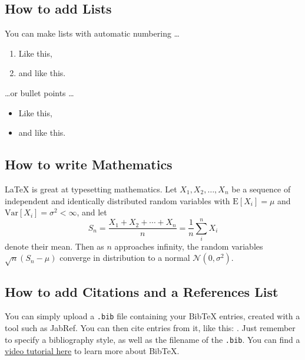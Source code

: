 \documentclass{article}
\begin{document}
\subsection{How to add Lists}

You can make lists with automatic numbering \dots

\begin{enumerate}
\item Like this,
\item and like this.
\end{enumerate}
\dots or bullet points \dots
\begin{itemize}
\item Like this,
\item and like this.
\end{itemize}

\subsection{How to write Mathematics}

\LaTeX{} is great at typesetting mathematics. Let $X_1, X_2, \ldots, X_n$ be a sequence of independent and identically distributed random variables with $\text{E}[X_i] = \mu$ and $\text{Var}[X_i] = \sigma^2 < \infty$, and let
\[S_n = \frac{X_1 + X_2 + \cdots + X_n}{n}
      = \frac{1}{n}\sum_{i}^{n} X_i\]
denote their mean. Then as $n$ approaches infinity, the random variables $\sqrt{n}(S_n - \mu)$ converge in distribution to a normal $\mathcal{N}(0, \sigma^2)$.


\subsection{How to add Citations and a References List}

You can simply upload a \verb|.bib| file containing your BibTeX entries, created with a tool such as JabRef. You can then cite entries from it, like this: \cite{greenwade93}. Just remember to specify a bibliography style, as well as the filename of the \verb|.bib|. You can find a \href{https://www.overleaf.com/help/97-how-to-include-a-bibliography-using-bibtex}{video tutorial here} to learn more about BibTeX.




\end{document}
